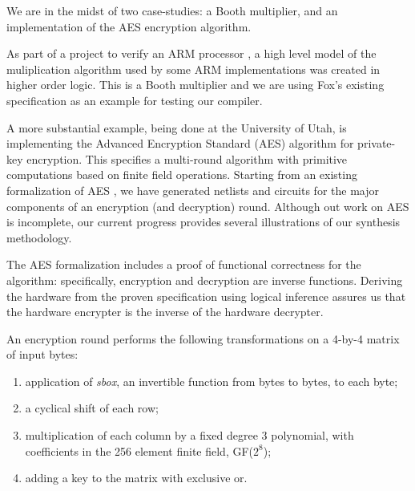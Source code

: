 

We are in the midst of two case-studies: a Booth multiplier, and an implementation
of the AES encryption algorithm.

As part of a project to verify an ARM processor \cite{Fox02}, a high
level model of the muliplication algorithm used by some ARM
implementations was created in higher order logic. This is a Booth
multiplier and we are using Fox's existing specification as an example
for testing our compiler. 


A more substantial example, being done at the University of Utah, is
implementing the Advanced Encryption Standard (AES) \cite{AES}
algorithm for private-key encryption. This specifies a multi-round
algorithm with primitive computations based on finite field
operations.  Starting from an existing formalization of AES
\cite{slind:aes}, we have generated netlists and circuits for the major
components of an encryption (and decryption) round.  Although out work on AES
is incomplete, our current progress provides several illustrations of our
synthesis methodology.

The AES formalization includes a proof of functional correctness  for the
algorithm: specifically, encryption and decryption are inverse functions.
Deriving the hardware from the proven specification using logical inference
assures us that the hardware encrypter is the inverse of the hardware
decrypter.

An encryption round performs the following transformations on a 4-by-4 matrix
of input bytes:
\begin{enumerate}
\item
application of \emph{sbox}, an invertible function from bytes to bytes,
to each byte;
\item
a cyclical shift of each row;
\item
multiplication of each column by a fixed degree 3 polynomial, with coefficients
in the 256 element finite field, GF($2^8$);
\item
adding a key to the matrix with exclusive or.
\end{enumerate}


